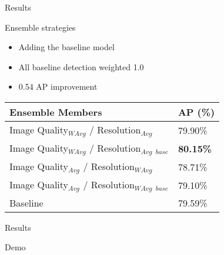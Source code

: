 \begin{frame}{Results}{}
    \begin{block}{Ensemble strategies}
    \begin{itemize}
        \item Adding the baseline model
        \item All baseline detection weighted 1.0
        \item 0.54 AP improvement
    \end{itemize}  
\end{block} 
    \begin{table}[h]
    \centering
    \begin{tabular}{|l|l|}
    \hline
    \textbf{Ensemble Members}                  & \textbf{AP (\%)} \\ \hline
    Image Quality$_{WAvg}$ / Resolution$_{Avg}$  & 79.90\% \\ \hline
    Image Quality$_{WAvg}$ / Resolution$_{Avg}$ $_{base}$ & \textbf{80.15\%} \\ \hline
    Image Quality$_{Avg}$ / Resolution$_{WAvg}$ & 78.71\% \\ \hline
    Image Quality$_{Avg}$ / Resolution$_{WAvg}$ $_{base}$ & 79.10\% \\ \hline
    Baseline                          & 79.59\% \\ \hline
    \end{tabular}
    \end{table}
\end{frame}

\begin{frame}{Results}{}
    \begin{block}{Demo}

\end{block} 
\end{frame}